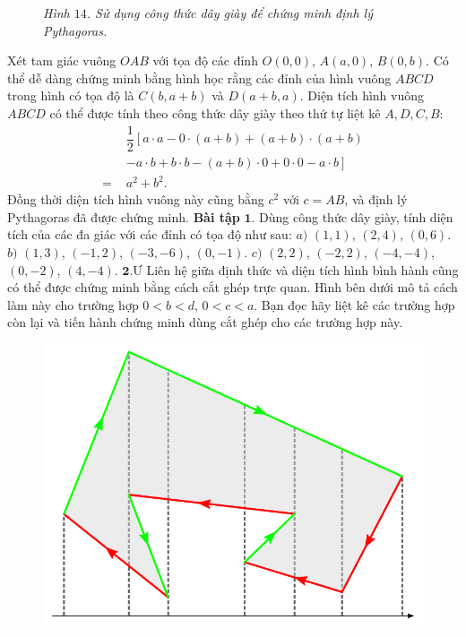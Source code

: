 \begin{multicols}{2}
\begin{figure}[H]
		\caption{\small\textit{\color{toanhocdoisong}Hình $14$. Sử dụng công thức dây giày để chứng minh định lý Pythagoras.}}
		\vspace*{-10pt}
	\end{figure}
	Xét tam giác vuông $OAB$ với tọa độ các đỉnh $O(0,0)$, $A(a,0)$, $B(0,b)$. Có thể dễ dàng chứng minh bằng hình học rằng các đỉnh của hình vuông $ABCD$ trong hình có tọa độ là $C(b,a+b)$ và $D(a+b,a)$.
	\vskip 0.1cm
	Diện tích hình vuông $ABCD$ có thể được tính theo công thức dây giày theo thứ tự liệt kê $A, D, C, B$:
	\begin{align*}
		&\dfrac{1}{2}\left[a\cdot a - 0 \cdot(a+b) + (a+b)\cdot(a+b) \right.\\
		&\left.- a\cdot b + b\cdot b - (a+b)\cdot 0 + 0 \cdot 0 - a\cdot b\right]\\
		=\,\, &a^2 + b^2.
	\end{align*}
	Đồng thời diện tích hình vuông này cũng bằng $c^2$ với $c=AB$, và định lý Pythagoras đã được chứng minh.
	\vskip 0.1cm
	\textbf{\color{toanhocdoisong}Bài tập}
	\vskip 0.1cm
	$\pmb{1.}$ Dùng công thức dây giày, tính diện tích của các đa giác với các đỉnh có tọa độ như sau:
	\vskip 0.05cm
	$a)$ $(1,1)$, $(2,4)$, $(0,6)$.
	\vskip 0.1cm
	$b)$ $(1,3)$, $(-1,2)$, $(-3, -6)$, $(0,-1)$.
	\vskip 0.1cm
	$c)$ $(2,2)$, $(-2,2)$, $(-4, -4)$, $(0,-2)$, $(4,-4)$.
	\vskip 0.1cm
	$\pmb{2.}Ư$ Liên hệ giữa định thức và diện tích hình bình hành cũng có thể được chứng minh bằng cách cắt ghép trực quan. Hình bên dưới mô tả cách làm này cho trường hợp $0<b<d$, $0<c<a$. Bạn đọc hãy liệt kê các trường hợp còn lại và tiến hành chứng minh dùng cắt ghép cho các trường hợp này.
	\begin{figure}[H]
		\vspace*{-5pt}
		\centering
		\captionsetup{labelformat= empty, justification=centering}
		\includegraphics[width= 0.8\linewidth]{18}

\end{figure}
\end{multicols}
